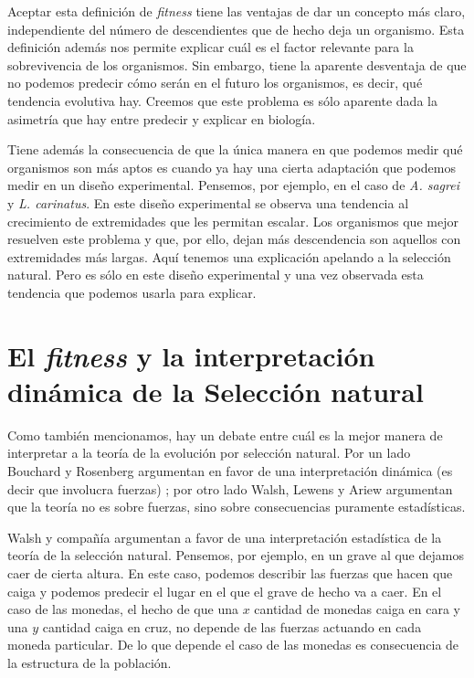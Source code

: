 
Aceptar esta definición de \emph{fitness} tiene las ventajas de dar un concepto más claro, independiente del número de descendientes que de hecho deja un organismo. Esta definición además nos permite explicar cuál es el factor relevante para la sobrevivencia de los organismos. Sin embargo, tiene la aparente desventaja de que no podemos predecir cómo serán en el futuro los organismos, es decir, qué tendencia evolutiva hay. Creemos que este problema es sólo aparente dada la asimetría que hay entre predecir y explicar en biología.

Tiene además la consecuencia de que la única manera en que podemos medir qué organismos son más aptos es cuando ya hay una cierta adaptación que podemos medir en un diseño experimental. Pensemos, por ejemplo, en el caso de \emph{A. sagrei} y \emph{L. carinatus}. En este diseño experimental se observa una tendencia al crecimiento de extremidades que les permitan escalar. Los organismos que mejor resuelven este problema y que, por ello, dejan más descendencia son aquellos con extremidades más largas. Aquí tenemos una explicación apelando a la selección natural. Pero es sólo en este diseño experimental y una vez observada esta tendencia que podemos usarla para explicar.

\section{El \emph{fitness} y la interpretación dinámica de la Selección natural}

Como también mencionamos, hay un debate entre cuál es la mejor manera de interpretar a la teoría de la evolución por selección natural. Por un lado Bouchard y Rosenberg argumentan en favor de una interpretación dinámica (es decir que involucra fuerzas) \citeyear{Bouchard2004}; por otro lado Walsh, Lewens y Ariew \citeyear{Walsh2002} argumentan que la teoría no es sobre fuerzas, sino sobre consecuencias puramente estadísticas.

Walsh y compañía argumentan a favor de una interpretación estadística de la teoría de la selección natural. Pensemos, por ejemplo, en un grave al que dejamos caer de cierta altura. En este caso, podemos describir las fuerzas que hacen que caiga y podemos predecir el lugar en el que el grave de hecho va a caer. En el caso de las monedas, el hecho de que una $x$ cantidad de monedas caiga en cara y una $y$ cantidad caiga en cruz, no depende de las fuerzas actuando en cada moneda particular. De lo que depende el caso de las monedas es consecuencia de la estructura de la población.

